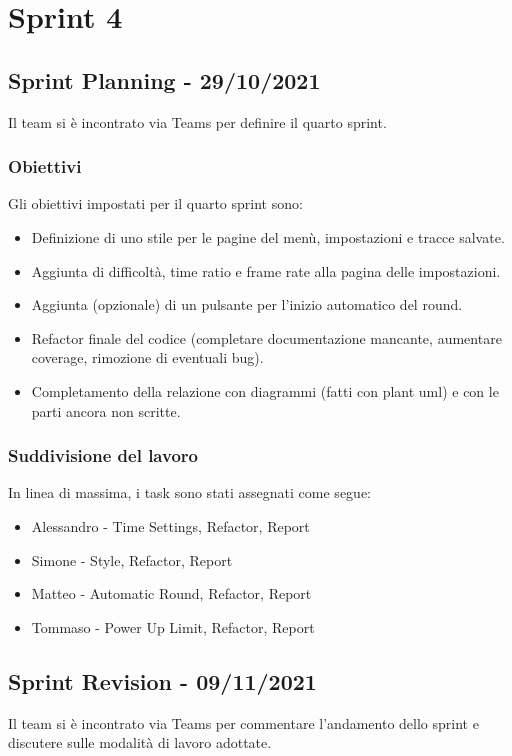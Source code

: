 \section{Sprint 4}
\subsection{Sprint Planning - 29/10/2021}
Il team si è incontrato via Teams per definire il quarto sprint.

\subsubsection{Obiettivi}
Gli obiettivi impostati per il quarto sprint sono:
\begin{itemize}
    \item Definizione di uno stile per le pagine del menù, impostazioni e tracce salvate.
    \item Aggiunta di difficoltà, time ratio e frame rate alla pagina delle impostazioni.
    \item Aggiunta (opzionale) di un pulsante per l'inizio automatico del round.
    \item Refactor finale del codice (completare documentazione mancante, aumentare coverage, rimozione di eventuali bug).
    \item Completamento della relazione con diagrammi (fatti con plant uml) e con le parti ancora non scritte.
\end{itemize}

\subsubsection{Suddivisione del lavoro}
In linea di massima, i task sono stati assegnati come segue:
\begin{itemize}
    \item Alessandro - Time Settings, Refactor, Report
    \item Simone - Style, Refactor, Report
    \item Matteo - Automatic Round, Refactor, Report
    \item Tommaso - Power Up Limit, Refactor, Report
\end{itemize}

\subsection{Sprint Revision - 09/11/2021}
Il team si è incontrato via Teams per commentare l'andamento dello sprint e discutere sulle modalità di lavoro adottate.

